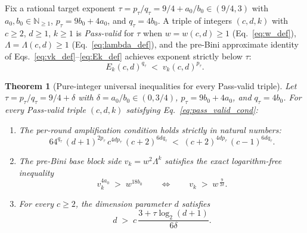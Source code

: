 \documentclass[11pt,a4paper]{article}
\theoremstyle{plain}
\newtheorem{theorem}{Theorem}[section]
\theoremstyle{definition}
\theoremstyle{remark}
\newcommand{\N}{\mathbb{N}}
\begin{document}
Fix a rational target exponent $\tau = p_\tau / q_\tau = 9/4 + a_0/b_0 \in (9/4, 3)$ with $a_0, b_0 \in \N_{\ge 1}$, $p_\tau = 9 b_0 + 4 a_0$, and $q_\tau = 4 b_0$. A triple of integers $(c, d, k)$ with $c \ge 2$, $d \ge 1$, $k \ge 1$ is \emph{Pass-valid} for $\tau$ when $w = w(c, d) \ge 1$ (Eq.~\eqref{eq:w_def}), $\Lambda = \Lambda(c, d) \ge 1$ (Eq.~\eqref{eq:lambda_def}), and the pre-Bini approximate identity of Eqs.~\eqref{eq:vk_def}--\eqref{eq:Ek_def} achieves exponent strictly below $\tau$:
\begin{equation}
    E_k(c, d)^{q_\tau} \;<\; v_k(c, d)^{p_\tau} .
    \label{eq:pass_valid_cond}
\end{equation}

\begin{theorem}[Pure-integer universal inequalities for every Pass-valid triple]
\label{thm:universal_round_and_vk}
Let $\tau = p_\tau / q_\tau = 9/4 + \delta$ with $\delta = a_0/b_0 \in (0, 3/4)$, $p_\tau = 9 b_0 + 4 a_0$, and $q_\tau = 4 b_0$. For every Pass-valid triple $(c, d, k)$ satisfying Eq.~\eqref{eq:pass_valid_cond}:
\begin{enumerate}[label=(\roman*)]
\item The per-round amplification condition holds strictly in natural numbers:
\begin{equation}
    64^{q_\tau}\,(d + 1)^{2 p_\tau}\,c^{4 d p_\tau}\,(c + 2)^{6 d q_\tau} \;<\; (c + 2)^{4 d p_\tau}\,(c - 1)^{6 d q_\tau} .
    \label{eq:univ_round_nat}
\end{equation}
\item The pre-Bini base block side $v_k = w^2 \Lambda^k$ satisfies the exact logarithm-free inequality
\begin{equation}
    \boxed{v_k^{4 a_0} \;>\; w^{18 b_0}} \qquad\Longleftrightarrow\qquad v_k \;>\; w^{\,\frac{9}{2\delta}} .
    \label{eq:univ_vk_vs_w}
\end{equation}
\item For every $c \ge 2$, the dimension parameter $d$ satisfies
\begin{equation}
    d \;>\; c\,\frac{3 + \tau \log_2(d + 1)}{6\delta} .
    \label{eq:univ_d_linear_c}
\end{equation}
\end{enumerate}
\end{theorem}
\end{document}
